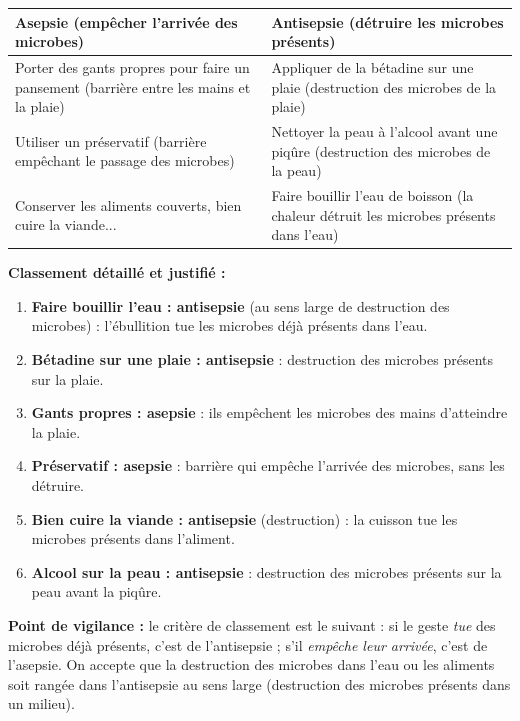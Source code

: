 \documentclass[11pt]{article}
\begin{document}
\begin{corrige}
\begin{center}
\begin{tabularx}{\linewidth}{|X|X|}
\hline
\rowcolor{popblueL} \textbf{Asepsie (empêcher l'arrivée des microbes)} & \textbf{Antisepsie (détruire les microbes présents)} \\
\hline
Porter des gants propres pour faire un pansement (barrière entre les mains et la plaie) & Appliquer de la bétadine sur une plaie (destruction des microbes de la plaie) \\
\hline
Utiliser un préservatif (barrière empêchant le passage des microbes) & Nettoyer la peau à l'alcool avant une piqûre (destruction des microbes de la peau) \\
\hline
Conserver les aliments couverts, bien cuire la viande... & Faire bouillir l'eau de boisson (la chaleur détruit les microbes présents dans l'eau) \\
\hline
\end{tabularx}
\end{center}
\textbf{Classement détaillé et justifié :}
\begin{enumerate}
\item \textbf{Faire bouillir l'eau : antisepsie} (au sens large de destruction des microbes) : l'ébullition tue les microbes déjà présents dans l'eau.
\item \textbf{Bétadine sur une plaie : antisepsie} : destruction des microbes présents sur la plaie.
\item \textbf{Gants propres : asepsie} : ils empêchent les microbes des mains d'atteindre la plaie.
\item \textbf{Préservatif : asepsie} : barrière qui empêche l'arrivée des microbes, sans les détruire.
\item \textbf{Bien cuire la viande : antisepsie} (destruction) : la cuisson tue les microbes présents dans l'aliment.
\item \textbf{Alcool sur la peau : antisepsie} : destruction des microbes présents sur la peau avant la piqûre.
\end{enumerate}
\textbf{Point de vigilance :} le critère de classement est le suivant : si le geste \emph{tue} des microbes déjà présents, c'est de l'antisepsie ; s'il \emph{empêche leur arrivée}, c'est de l'asepsie. On accepte que la destruction des microbes dans l'eau ou les aliments soit rangée dans l'antisepsie au sens large (destruction des microbes présents dans un milieu).
\end{corrige}
\end{document}

